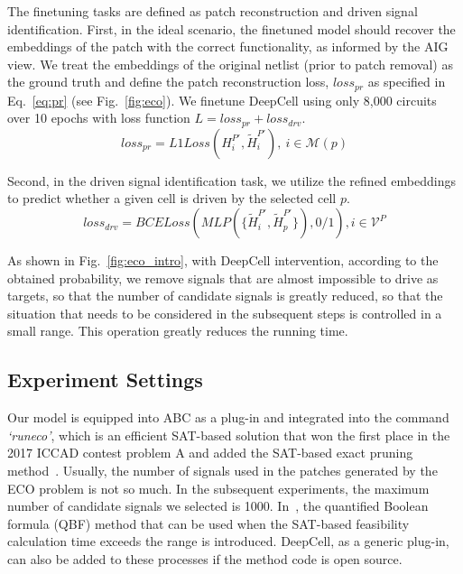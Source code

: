 The finetuning tasks are defined as patch reconstruction and driven signal identification. First, in the ideal scenario, the finetuned model should recover the embeddings of the patch with the correct functionality, as informed by the AIG view. We treat the embeddings of the original netlist (prior to patch removal) as the ground truth and define the patch reconstruction loss, $loss_{pr}$ as specified in Eq.~\eqref{eq:pr} (see Fig.~\ref{fig:eco}). We finetune DeepCell using only 8,000 circuits over 10 epochs with loss function $L=loss_{pr} + loss_{drv}$. 
\begin{equation} \label{eq:pr}
    loss_{pr} = L1Loss(H_i^{P'}, \widetilde{H}_i^{P'}),~i\in\mathcal{M}(p)
\end{equation}

Second, in the driven signal identification task, we utilize the refined embeddings to predict whether a given cell is driven by the selected cell $p$. 
\begin{equation} \label{eq:driven}
    loss_{drv} = BCELoss(MLP(\{\widetilde{H}_i^{P'}, \widetilde{H}_p^{P'}\}), 0/1), i\in\mathcal{V}^P
\end{equation}

As shown in Fig.~\ref{fig:eco_intro}, with DeepCell intervention, according to the obtained probability, we remove signals that are almost impossible to drive as targets, so that the number of candidate signals is greatly reduced, so that the situation that needs to be considered in the subsequent steps is controlled in a small range. This operation greatly reduces the running time.

\subsection{Experiment Settings}
Our model is equipped into ABC as a plug-in and integrated into the command \textit{`runeco'}, which is an efficient SAT-based solution that won the first place in the 2017 ICCAD contest problem A and added the SAT-based exact pruning method~\cite{dao2018efficient}. Usually, the number of signals used in the patches generated by the ECO problem is not so much. In the subsequent experiments, the maximum number of candidate signals we selected is 1000. In~\cite{dao2018efficient}, the quantified Boolean formula (QBF) method that can be used when the SAT-based feasibility calculation time exceeds the range is introduced. DeepCell, as a generic plug-in, can also be added to these processes if the method code is open source.

